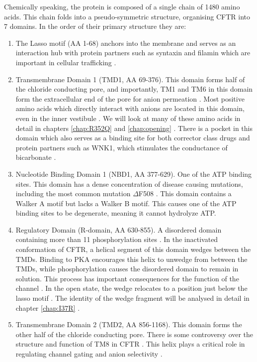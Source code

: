 Chemically speaking, the protein is composed of a single chain of 1480 amino acids.  This chain folds into a pseudo-symmetric structure, organising CFTR into 7 domains. In the order of their primary structure they are: 

\begin{enumerate}
	\item The Lasso motif (AA 1-68) anchors into the membrane and serves as an interaction hub with protein partners such as syntaxin and filamin which are important in cellular trafficking \cite{cormet-boyaka2002, naren1998, thelin2007}. 
	\item Transmembrane Domain 1 (TMD1, AA 69-376). This domain forms half of the chloride conducting pore, and importantly, TM1 and TM6 in this domain form the extracellular end of the pore for anion permeation \cite{linsdell2006, linsdell2022}. Most positive amino acids which directly interact with anions are located in this domain, even in the inner vestibule \cite{linsdell2018}. We will look at many of these amino acids in detail in chapters \ref{chap:R352Q} and \ref{chap:opening} \cite{wong2022a}. There is a pocket in this domain which also serves as a binding site for both corrector class drugs and protein partners such as WNK1, which stimulates the conductance of bicarbonate \cite{kim2019}. 
	\item Nucleotide Binding Domain 1 (NBD1, AA 377-629). One of the ATP binding sites. This domain has a dense concentration of disease causing mutations, including the most common mutation $\Delta$F508 \cite{cftr2}. This domain contains a Walker A motif but lacks a Walker B motif. This causes one of the ATP binding sites to be degenerate, meaning it cannot hydrolyze ATP. 
	\item Regulatory Domain (R-domain, AA 630-855). A disordered domain containing more than 11 phosphorylation sites \cite{mihalyi2020}. In the inactivated conformation of CFTR, a helical segment of this domain wedges between the TMDs. Binding to PKA encourages this helix to unwedge from between the TMDs, while phosphorylation causes the disordered domain to remain in solution. This process has important consequences for the function of the channel \cite{ostedgaard2000, mihalyi2020, bozoky2013, baker2007}. In the open state, the wedge relocates to a position just below the lasso motif \cite{zhang2018}. The identity of the wedge fragment will be analysed in detail in chapter \ref{chap:I37R} \cite{wong2022}. 
	\item Transmembrane Domain 2 (TMD2, AA 856-1168). This domain forms the other half of the chloride conducting pore. There is some controversy over the structure and function of TM8 in CFTR \cite{hegedus2022, liu2019}. This helix plays a critical role in regulating channel gating and anion selectivity \cite{negoda2019}.

\end{enumerate}
